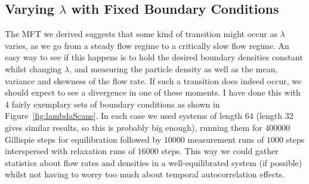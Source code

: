 \subsection{Varying $\lambda$ with Fixed Boundary Conditions}
The MFT we derived suggests that some kind of transition might occur as $\lambda$ varies, as we go from a steady flow regime to a critically slow flow regime. An easy way to see if this happens is to hold the desired boundary densities constant
whilst changing $\lambda$, and measuring the particle density as well as the mean, variance and skewness of the flow rate. If such a transition does indeed occur, we should expect to see a divergence in one of these moments. I have done this with
4 fairly exemplary sets of boundary conditions as shown in Figure~\ref{fig:lambdaScans}. In each case we used systems of length $64$ (length $32$ gives similar results, so this
is probably big enough), running them for $400000$ Gillispie steps for equilibration followed by $10000$ measurement runs of $1000$ steps interspersed with relaxation runs of $16000$
steps. This way we could gather statistics about flow rates and densities in a well-equilibrated system (if possible) whilst not having to worry too much about temporal autocorrelation effects.
